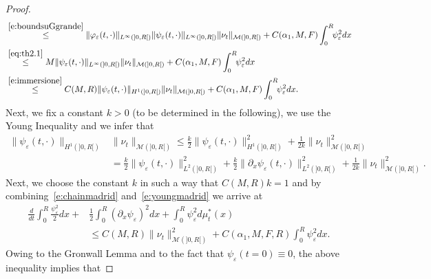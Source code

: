 \documentclass[11pt,leqno]{amsart}
\numberwithin{equation}{section}
\begin{document}
\begin{proof}
\begin{equation}
\begin{split}
    &
    \stackrel{\eqref{e:boundsuGgrande}}{\leq} 
    \| {\varphi}_{\varepsilon} (t, \cdot) \|_{L^\infty (]0, R[)}
    \| \psi_{\varepsilon} (t, \cdot) \|_{L^\infty (]0, R[)}
    \| \nu_t \|_{\mathcal M (]0, R[)} 
    + C(\alpha_1, M, F) 
    \int_0^R \! \! \psi^2_{\varepsilon}  dx \\
    &
    \stackrel{\eqref{eq:th2.1}}{\leq} 
    M  \| \psi_{\varepsilon} (t, \cdot) \|_{L^\infty (]0, R[)}
    \| \nu_t \|_{\mathcal M (]0, R[)} 
    + C(\alpha_1, M, F) 
    \int_0^R \! \! \psi^2_{\varepsilon}  dx \\
    &
     \stackrel{\eqref{e:immersione}}{\leq} 
    C(M, R)  \| \psi_{\varepsilon} (t, \cdot) \|_{H^1 (]0, R[)}
    \| \nu_t \|_{\mathcal M (]0, R[)} 
    + C(\alpha_1, M, F) 
    \int_0^R \! \! \psi^2_{\varepsilon}  dx.
    \end{split}
\end{equation} 
Next, we fix a constant $k >0$
(to be determined in the following), we use the Young Inequality and we infer that 
\begin{equation}
\label{e:youngmadrid}
\begin{split}
    \| \psi_{\varepsilon} (t, \cdot) \|_{H^1 (]0, R[)} & 
    \| \nu_t \|_{\mathcal M (]0, R[)}  \leq 
    \frac{k}{2} \| \psi_{\varepsilon} (t, \cdot) \|^2_{H^1 (]0, R[)}+
    \frac{1}{2k} \| \nu_t \|^2_{\mathcal M (]0, R[)} \\
    & =  \frac{k}{2} \| \psi_{\varepsilon} (t, \cdot) \|^2_{L^2 (]0, R[)}
    +  \frac{k}{2} \| {\partial_x } \psi_{\varepsilon} (t, \cdot) \|^2_{L^2 (]0, R[)}
    +  \frac{1}{2k} \| \nu_t \|^2_{\mathcal M (]0, R[)} .
    \end{split}
\end{equation} 
Next, we choose the constant $k$ in such a way 
that $C(M, R) k =1$ and by combining~\eqref{e:chainmadrid} and~\eqref{e:youngmadrid} we arrive at 
\begin{equation}
\label{e:chain2madrid}
\begin{split}
    \frac{d}{dt} 
    \int_0^R \frac{\psi_{\varepsilon}^2}{2} dx + &
    \frac{1}{2}
    \int_0^R ({\partial_x } \psi_{\varepsilon})^2 dx +
    \int_0^R \psi^2_{\varepsilon} d \mu^\ast_t (x) \\
    & \leq 
    C(M,R)
    \| \nu_t \|^2_{\mathcal M (]0, R[)} 
    + C(\alpha_1, M, F, R) 
    \int_0^R \! \! \psi^2_{\varepsilon}  dx.
    \end{split}
\end{equation}
Owing to the Gronwall Lemma and to the fact that $\psi_{\varepsilon} (t=0) \equiv0$, the above inequality implies that 

\end{proof}
\end{document}

